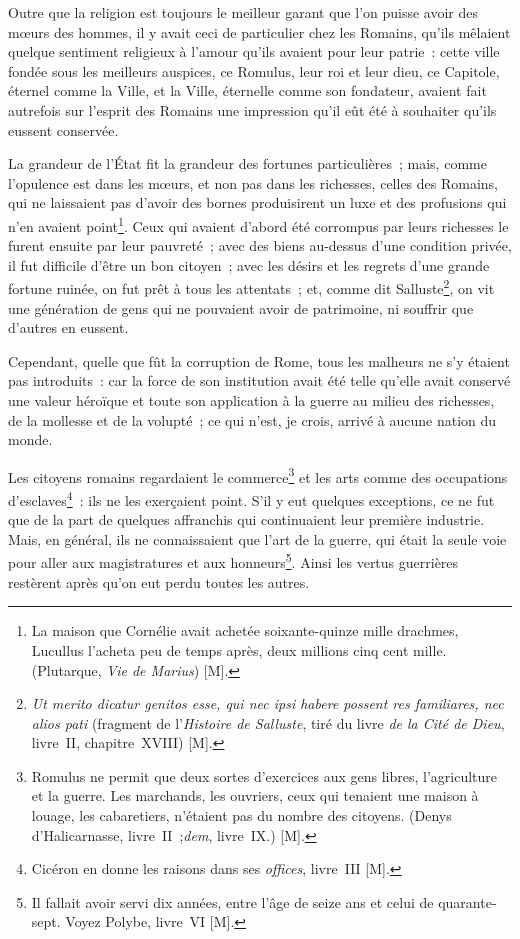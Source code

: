 \documentclass[french,twoside]{book} %
\newcommand\chapterclose{} %
\begin{document}
Outre que la religion est toujours le meilleur garant que l’on puisse avoir des mœurs des hommes, il y avait ceci de particulier chez les Romains, qu’ils mêlaient quelque sentiment religieux à l’amour qu’ils avaient pour leur patrie : cette ville fondée sous les meilleurs auspices, ce Romulus, leur roi et leur dieu, ce Capitole, éternel comme la Ville, et la Ville, éternelle comme son fondateur, avaient fait autrefois sur l’esprit des Romains une impression qu’il eût été à souhaiter qu’ils eussent conservée.\par
La grandeur de l’État fit la grandeur des fortunes particulières ; mais, comme l’opulence est dans les mœurs, et non pas dans les richesses, celles des Romains, qui ne laissaient pas d’avoir des bornes produisirent un luxe et des profusions qui n’en avaient point\footnote{La maison que Cornélie avait achetée soixante-quinze mille drachmes, Lucullus l’acheta peu de temps après, deux millions cinq cent mille. (Plutarque, {\itshape Vie de Marius}) [M].}. Ceux qui avaient d’abord été corrompus par leurs richesses le furent ensuite par leur pauvreté ; avec des biens au-dessus d’une condition privée, il fut difficile d’être un bon citoyen ; avec les désirs et les regrets d’une grande fortune ruinée, on fut prêt à tous les attentats ; et, comme dit Salluste\footnote{{\itshape Ut merito dicatur genitos esse, qui nec ipsi habere possent res familiares, nec alios pati} (fragment de l’{\itshape Histoire de Salluste}, tiré du livre {\itshape de la Cité de Dieu}, livre II, chapitre XVIII) [M].}, on vit une génération de gens qui ne pouvaient avoir de patrimoine, ni souffrir que d’autres en eussent.\par
Cependant, quelle que fût la corruption de Rome, tous les malheurs ne s’y étaient pas introduits : car la force de son institution avait été telle qu’elle avait conservé une valeur héroïque et toute son application à la guerre au milieu des richesses, de la mollesse et de la volupté ; ce qui n’est, je crois, arrivé à aucune nation du monde.\par
Les citoyens romains regardaient le commerce\footnote{Romulus ne permit que deux sortes d’exercices aux gens libres, l’agriculture et la guerre. Les marchands, les ouvriers, ceux qui tenaient une maison à louage, les cabaretiers, n’étaient pas du nombre des citoyens. (Denys d’Halicarnasse, livre II ;{\itshape dem}, livre IX.) [M].} et les arts comme des occupations d’esclaves\footnote{Cicéron en donne les raisons dans ses {\itshape offices}, livre III [M].} : ils ne les exerçaient point. S’il y eut quelques exceptions, ce ne fut que de la part de quelques affranchis qui continuaient leur première industrie. Mais, en général, ils ne connaissaient que l’art de la guerre, qui était la seule voie pour aller aux magistratures et aux honneurs\footnote{Il fallait avoir servi dix années, entre l’âge de seize ans et celui de quarante-sept. Voyez Polybe, livre VI [M].}. Ainsi les vertus guerrières restèrent après qu’on eut perdu toutes les autres.
\chapterclose
\end{document}
